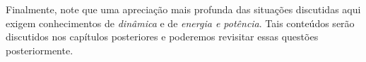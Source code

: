 Finalmente, note que uma apreciação mais profunda das situações discutidas aqui exigem conhecimentos de \emph{dinâmica} e de \emph{energia e potência}. Tais conteúdos serão discutidos nos capítulos posteriores e poderemos revisitar essas questões posteriormente.



